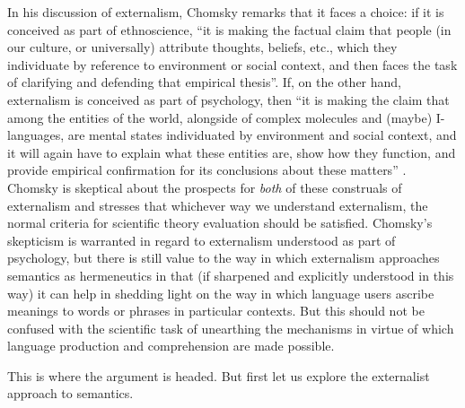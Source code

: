 In his discussion of externalism, Chomsky remarks that it faces a choice: if it is conceived as part of ethnoscience, “it is making the factual claim that people (in our culture, or universally) attribute thoughts, beliefs, etc., which they individuate by reference to environment or social context, and then faces the task of clarifying and defending that empirical thesis”. If, on the other hand, externalism is conceived as part of psychology, then “it is making the claim that among the entities of the world, alongside of complex molecules and (maybe) I-languages, are mental states individuated by environment and social context, and it will again have to explain what these entities are, show how they function, and provide empirical confirmation for its conclusions about these matters” \citep[269-270]{Chomsky2003}. Chomsky is skeptical about the prospects for \textit{both} of these construals of externalism and stresses that whichever way we understand externalism, the normal criteria for scientific theory evaluation should be satisfied. Chomsky’s skepticism is warranted in regard to externalism understood as part of psychology, but there is still value to the way in which externalism approaches semantics as hermeneutics in that (if sharpened and explicitly understood in this way) it can help in shedding light on the way in which language users ascribe meanings to words or phrases in particular contexts. But this should not be confused with the scientific task of unearthing the mechanisms in virtue of which language production and comprehension are made possible.

This is where the argument is headed. But first let us explore the externalist approach to semantics.

